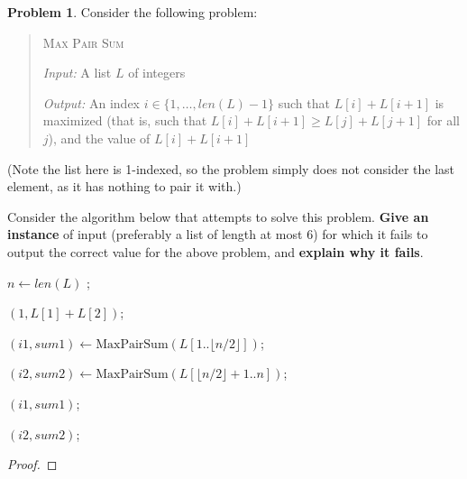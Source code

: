 \documentclass[11pt]{article}
\theoremstyle{definition}
\theoremstyle{definition}
\newtheorem{required}{Problem}
\theoremstyle{definition}
\begin{document}
\begin{required} \label{dandc}
Consider the following problem:
\begin{quotation}
\noindent \textsc{Max Pair Sum}

\noindent \textit{Input:} A list $L$ of integers

\noindent \textit{Output:} An index $i \in \{1,\dotsc,len(L)-1\}$ such that $L[i]+L[i+1]$ is maximized (that is, such that $L[i] + L[i+1] \geq L[j] + L[j+1]$ for all $j$), and the value of $L[i]+L[i+1]$
\end{quotation}
(Note the list here is 1-indexed, so the problem simply does not consider the last element, as it has nothing to pair it with.)

Consider the algorithm below that attempts to solve this problem. \textbf{Give an instance} of input (preferably a list of length at most 6) for which it fails to output the correct value for the above problem, and \textbf{explain why it fails}.

\begin{algorithm}
\caption{Proposed divide-and-conquer algorithm for the Max Pair Sum problem}
\begin{algorithmic}[1]
$n \gets len(L)$
\Return;
\EndIf

\Return $(1,L[1] + L[2])$;
\EndIf


\State $(i1,sum1) \gets \text{MaxPairSum}(L[1..\lfloor n/2 \rfloor])$;

\State $(i2,sum2) \gets \text{MaxPairSum}(L[\lfloor n/2 \rfloor + 1..n])$;


\State \Return $(i1,sum1)$;
\Else

\State \Return $(i2,sum2)$;

\EndIf
\EndProcedure
\end{algorithmic}
\end{algorithm}

\begin{proof}
\end{proof}
\end{required}



\end{document}
